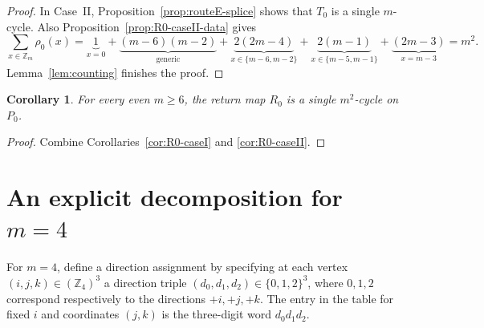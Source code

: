 \documentclass[11pt]{article}
\newtheorem{corollary}{Corollary}
\newcommand{\Zm}{\mathbb Z_m}
\begin{document}
\begin{proof}
In Case~II, Proposition~\ref{prop:routeE-splice} shows that $T_0$ is a single $m$-cycle.
Also Proposition~\ref{prop:R0-caseII-data} gives
\[
\sum_{x\in \Zm}\rho_0(x)=\underbrace{1}_{x=0}+\underbrace{(m-6)(m-2)}_{\text{generic}}+\underbrace{2(2m-4)}_{x\in\{m{-}6,m{-}2\}}+\underbrace{2(m-1)}_{x\in\{m{-}5,m{-}1\}}+\underbrace{(2m-3)}_{x=m{-}3}=m^2.
\]
Lemma~\ref{lem:counting} finishes the proof.
\end{proof}

\begin{corollary}\label{cor:R0-all}
For every even $m\ge 6$, the return map $R_0$ is a single $m^2$-cycle on $P_0$.
\end{corollary}

\begin{proof}
Combine Corollaries~\ref{cor:R0-caseI} and \ref{cor:R0-caseII}.
\end{proof}

\section{An explicit decomposition for $m=4$}\label{app:m4}

For $m=4$, define a direction assignment by specifying at each vertex $(i,j,k)\in(\mathbb Z_4)^3$ a direction triple $(d_0,d_1,d_2)\in\{0,1,2\}^3$, where $0,1,2$ correspond respectively to the directions $+i,+j,+k$.
The entry in the table for fixed $i$ and coordinates $(j,k)$ is the three-digit word $d_0d_1d_2$.
\end{document}
